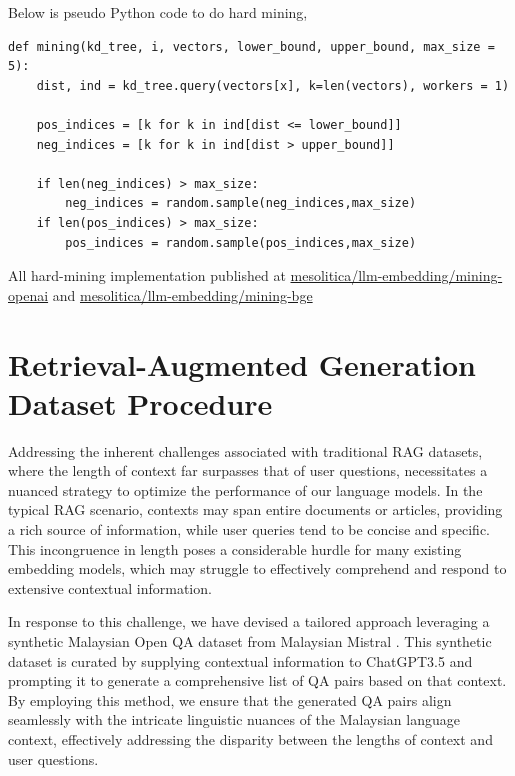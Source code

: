 \documentclass[preprint]{article}
\begin{document}
Below is pseudo Python code to do hard mining,

\begin{lstlisting}[breaklines=true]
def mining(kd_tree, i, vectors, lower_bound, upper_bound, max_size = 5):
    dist, ind = kd_tree.query(vectors[x], k=len(vectors), workers = 1)

    pos_indices = [k for k in ind[dist <= lower_bound]]
    neg_indices = [k for k in ind[dist > upper_bound]]

    if len(neg_indices) > max_size:
        neg_indices = random.sample(neg_indices,max_size)
    if len(pos_indices) > max_size:
        pos_indices = random.sample(pos_indices,max_size)
\end{lstlisting}

All hard-mining implementation published at \href{https://github.com/mesolitica/llm-embedding/tree/main/mining-openai}{mesolitica/llm-embedding/mining-openai} and \href{https://github.com/mesolitica/llm-embedding/tree/main/mining-bge}{mesolitica/llm-embedding/mining-bge}

\section{Retrieval-Augmented Generation Dataset Procedure}

Addressing the inherent challenges associated with traditional RAG datasets, where the length of context far surpasses that of user questions, necessitates a nuanced strategy to optimize the performance of our language models. In the typical RAG scenario, contexts may span entire documents or articles, providing a rich source of information, while user queries tend to be concise and specific. This incongruence in length poses a considerable hurdle for many existing embedding models, which may struggle to effectively comprehend and respond to extensive contextual information.

In response to this challenge, we have devised a tailored approach leveraging a synthetic Malaysian Open QA dataset from Malaysian Mistral \cite{zolkepli2024large}. This synthetic dataset is curated by supplying contextual information to ChatGPT3.5 and prompting it to generate a comprehensive list of QA pairs based on that context. By employing this method, we ensure that the generated QA pairs align seamlessly with the intricate linguistic nuances of the Malaysian language context, effectively addressing the disparity between the lengths of context and user questions.
\end{document}
